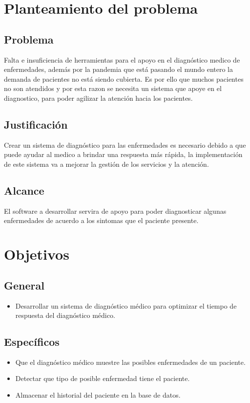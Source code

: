 \documentclass[preprint,12pt]{elsarticle}
\begin{document}
\section{Planteamiento del problema}
	\subsection{\textbf{Problema}}
Falta e insuficiencia de herramientas para el apoyo en el diagnóstico medico de enfermedades, además por la pandemia que está pasando el mundo entero la demanda de pacientes no está siendo cubierta. Es por ello que muchos pacientes no son atendidos y por esta razon se necesita un sistema que apoye en el diagnostico, para poder agilizar la atención hacia los pacientes.
	\subsection{\textbf{Justificación }}
Crear un sistema de diagnóstico para las enfermedades es necesario debido a que puede ayudar al medico a brindar una respuesta más rápida, la implementación de este sistema va a mejorar la gestión de los servicios y la atención.

	\subsection{\textbf{ Alcance }}
El software a desarrollar servira de apoyo para poder diagnosticar algunas enfermedades de acuerdo a los sintomas que el paciente presente.

\section{Objetivos}
		\subsection{\textbf{ General }}
	 \begin{itemize}
		\item Desarrollar un sistema de diagnóstico médico para optimizar el tiempo  de respuesta del diagnóstico médico.
	 \end{itemize}
		\subsection{\textbf{Específicos }}
\begin{itemize}
	\item Que el diagnóstico médico muestre las posibles enfermedades de un paciente.
	\item Detectar que tipo de posible enfermedad tiene el paciente. 
	\item Almacenar el historial del paciente en la base de datos. 
	\end{itemize}
\end{document}
